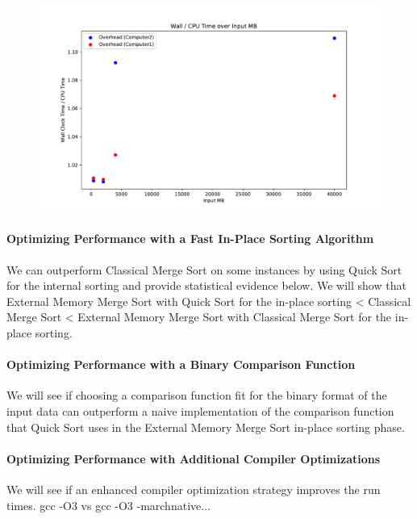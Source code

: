 \documentclass[twocolumn]{article}
\begin{document}
\begin{figure}[htb]
    \begin{minipage}{0.475 \textwidth}
        \centering
        \includegraphics[width=\textwidth]{./res/overhead_ratio.pdf}
        \caption{}
        \label{fig:overhead_ratio.pdf}
    \end{minipage}
\end{figure}

\paragraph*{Optimizing Performance with a Fast In-Place Sorting Algorithm}
We can outperform Classical Merge Sort on some instances by using Quick Sort for the internal sorting and provide statistical evidence below.
We will show that External Memory Merge Sort with Quick Sort for the in-place sorting < Classical Merge Sort < External Memory Merge Sort with Classical Merge Sort for the in-place sorting.
\paragraph*{Optimizing Performance with a Binary Comparison Function}
We will see if choosing a comparison function fit for the binary format of the input data can outperform a naive implementation of the comparison function that Quick Sort uses
in the External Memory Merge Sort in-place sorting phase.
\paragraph*{Optimizing Performance with Additional Compiler Optimizations}
We will see if an enhanced compiler optimization strategy improves the run times.
gcc -O3 vs gcc -O3 -marchnative...
\end{document}
